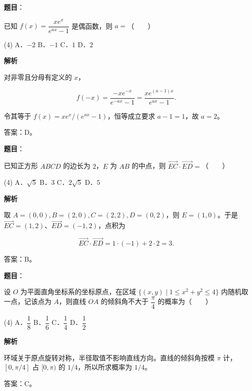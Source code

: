 \begin{answer}

\textbf{题目}：

已知 $f(x)=\dfrac{xe^x}{e^{ax}-1}$ 是偶函数，则 $a=$\mbox{（　　）}

\begin{gkopts}(4)
\task A．$-2$
\task B．$-1$
\task C．$1$
\task D．$2$
\end{gkopts}

\textbf{解析}

对非零且分母有定义的 $x$，

\nopagebreak[4]
\[
f(-x)=\frac{-xe^{-x}}{e^{-ax}-1}
=\frac{xe^{(a-1)x}}{e^{ax}-1}.
\]

令其等于 $f(x)=xe^x/(e^{ax}-1)$，恒等成立要求 $a-1=1$，故 $a=2$。

答案：D。


\end{answer}
\begin{answer}

\textbf{题目}：

已知正方形 $ABCD$ 的边长为 $2$，$E$ 为 $AB$ 的中点，则 $\overrightarrow{EC}\cdot\overrightarrow{ED}=$\mbox{（　　）}

\begin{gkopts}(4)
\task A．$\sqrt5$
\task B．$3$
\task C．$2\sqrt5$
\task D．$5$
\end{gkopts}

\textbf{解析}

取 $A=(0,0),B=(2,0),C=(2,2),D=(0,2)$，则 $E=(1,0)$。于是 $\overrightarrow{EC}=(1,2)$、$\overrightarrow{ED}=(-1,2)$，点积为

\nopagebreak[4]
\[
\overrightarrow{EC}\cdot\overrightarrow{ED}=1\cdot(-1)+2\cdot2=3.
\]

答案：B。


\end{answer}
\begin{answer}

\textbf{题目}：

设 $O$ 为平面直角坐标系的坐标原点，在区域 $\{(x,y)\mid 1\leqslant x^2+y^2\leqslant4\}$ 内随机取一点，记该点为 $A$，则直线 $OA$ 的倾斜角不大于 $\dfrac\pi4$ 的概率为\mbox{（　　）}

\begin{gkopts}(4)
\task A．$\dfrac18$
\task B．$\dfrac16$
\task C．$\dfrac14$
\task D．$\dfrac12$
\end{gkopts}

\textbf{解析}

环域关于原点旋转对称，半径取值不影响直线方向。直线的倾斜角按模 $\pi$ 计，$[0,\pi/4]$ 占 $[0,\pi)$ 的 $1/4$，所以所求概率为 $1/4$。

答案：C。


\end{answer}
